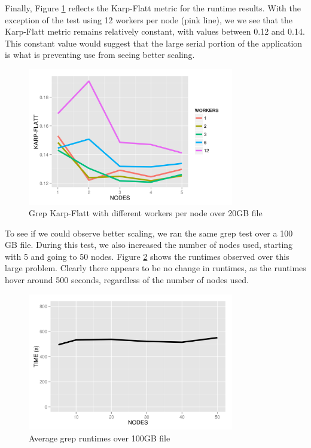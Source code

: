 \documentclass{article}
\begin{document}
Finally, Figure \ref{fig:workNodeKF} reflects the Karp-Flatt metric for the
runtime results. With the exception of the test using 12 workers per node (pink
line), we we see that the Karp-Flatt metric remains relatively constant, with
values between 0.12 and 0.14. This constant value would suggest that the
large serial portion of the application is what is preventing use from seeing
better scaling.

    \begin{figure}[H]
        \centering
        \includegraphics[width=90mm]{images/workerPerNodeKarpFlatt.png}
        \caption{Grep Karp-Flatt with different workers per node over 20GB file}
        \label{fig:workNodeKF}
    \end{figure}

To see if we could observe better scaling, we ran the same grep test over a
100 GB file. During this test, we also increased the number of nodes used,
starting with 5 and going to 50 nodes. Figure \ref{fig:bigTime} shows the
runtimes observed over this large problem.  Clearly there appears to be no
change in runtimes, as the runtimes hover around 500 seconds, regardless of the
number of nodes used.

    \begin{figure}[H]
        \centering
        \includegraphics[width=90mm]{images/bigDataTimes.png}
        \caption{Average grep runtimes over 100GB file}
        \label{fig:bigTime}
    \end{figure}
\end{document}
